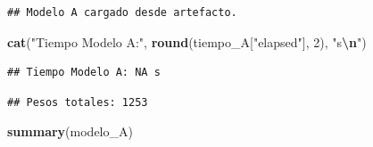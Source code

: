 \documentclass[
]{article}
\newenvironment{Shaded}{\begin{snugshade}}{\end{snugshade}}
\newcommand{\DecValTok}[1]{\textcolor[rgb]{0.00,0.00,0.81}{#1}}
\newcommand{\FunctionTok}[1]{\textcolor[rgb]{0.13,0.29,0.53}{\textbf{#1}}}
\newcommand{\NormalTok}[1]{#1}
\newcommand{\SpecialCharTok}[1]{\textcolor[rgb]{0.81,0.36,0.00}{\textbf{#1}}}
\newcommand{\StringTok}[1]{\textcolor[rgb]{0.31,0.60,0.02}{#1}}
\begin{document}
\begin{verbatim}
## Modelo A cargado desde artefacto.
\end{verbatim}

\begin{Shaded}
\begin{Highlighting}[]
\FunctionTok{cat}\NormalTok{(}\StringTok{"Tiempo Modelo A:"}\NormalTok{, }\FunctionTok{round}\NormalTok{(tiempo\_A[}\StringTok{"elapsed"}\NormalTok{], }\DecValTok{2}\NormalTok{), }\StringTok{"s}\SpecialCharTok{\textbackslash{}n}\StringTok{"}\NormalTok{)}
\end{Highlighting}
\end{Shaded}

\begin{verbatim}
## Tiempo Modelo A: NA s
\end{verbatim}

\begin{Shaded}
\end{Shaded}

\begin{verbatim}
## Pesos totales: 1253
\end{verbatim}

\begin{Shaded}
\begin{Highlighting}[]
\FunctionTok{summary}\NormalTok{(modelo\_A)}
\end{Highlighting}
\end{Shaded}
\end{document}
